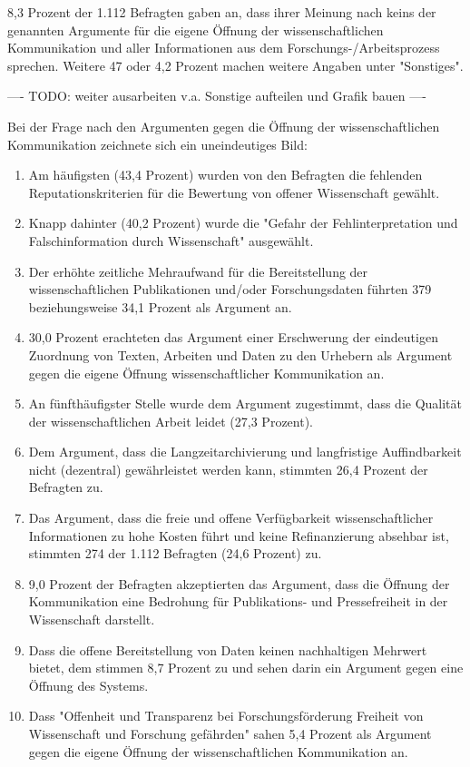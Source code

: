 8,3 Prozent der 1.112 Befragten gaben an, dass ihrer Meinung nach keins der genannten Argumente für die eigene Öffnung der wissenschaftlichen Kommunikation und aller Informationen aus dem Forschungs-/Arbeitsprozess sprechen. Weitere 47 oder 4,2 Prozent machen weitere Angaben unter "Sonstiges".

---- TODO: weiter ausarbeiten v.a. Sonstige aufteilen und Grafik bauen ----

Bei der Frage nach den Argumenten gegen die Öffnung der wissenschaftlichen Kommunikation zeichnete sich ein uneindeutiges Bild:
\begin{enumerate}
\item Am häufigsten (43,4 Prozent) wurden von den Befragten die fehlenden Reputationskriterien für die Bewertung von offener Wissenschaft gewählt.
\item Knapp dahinter (40,2 Prozent) wurde die "Gefahr der Fehlinterpretation und Falschinformation durch Wissenschaft" ausgewählt.
\item Der erhöhte zeitliche Mehraufwand für die Bereitstellung der wissenschaftlichen Publikationen und/oder Forschungsdaten führten 379 beziehungsweise 34,1 Prozent als Argument an.
\item 30,0 Prozent erachteten das Argument einer Erschwerung der eindeutigen Zuordnung von Texten, Arbeiten und Daten zu den Urhebern als Argument gegen die eigene Öffnung wissenschaftlicher Kommunikation an.
\item  An fünfthäufigster Stelle wurde dem Argument zugestimmt, dass die Qualität der wissenschaftlichen Arbeit leidet (27,3 Prozent).
\item Dem Argument, dass die Langzeitarchivierung und langfristige Auffindbarkeit nicht (dezentral) gewährleistet werden kann, stimmten 26,4 Prozent der Befragten zu.
\item Das Argument, dass die freie und offene Verfügbarkeit wissenschaftlicher Informationen zu hohe Kosten führt und keine Refinanzierung absehbar ist, stimmten 274 der 1.112 Befragten (24,6 Prozent) zu.
\item 9,0 Prozent der Befragten akzeptierten das Argument, dass die Öffnung der Kommunikation eine Bedrohung für Publikations- und Pressefreiheit in der Wissenschaft darstellt.
\item Dass die offene Bereitstellung von Daten keinen nachhaltigen Mehrwert bietet, dem stimmen 8,7 Prozent zu und sehen darin ein Argument gegen eine Öffnung des Systems.
\item Dass "Offenheit und Transparenz bei Forschungsförderung Freiheit von Wissenschaft und Forschung gefährden" sahen 5,4 Prozent als Argument gegen die eigene Öffnung der wissenschaftlichen Kommunikation an.
\end{enumerate}

